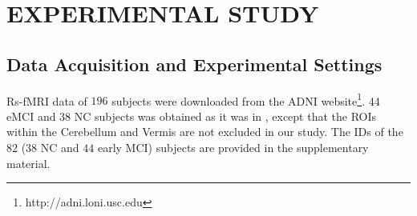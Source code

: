 \documentclass[journal]{IEEEtran}
\begin{document}
	


	\section{EXPERIMENTAL STUDY}
	\subsection{Data Acquisition and Experimental Settings}
	
	Rs-fMRI data of $196$ subjects were downloaded from the ADNI website\footnote{http://adni.loni.usc.edu}. 
	44 eMCI and 38 NC subjects was obtained as it was in  \cite{r14}, except that the ROIs within the Cerebellum and Vermis are not excluded in our study. The IDs of the $82$ ($38$ NC and $44$ early MCI) subjects are provided in the supplementary material. 
	
%	
	
\end{document}
